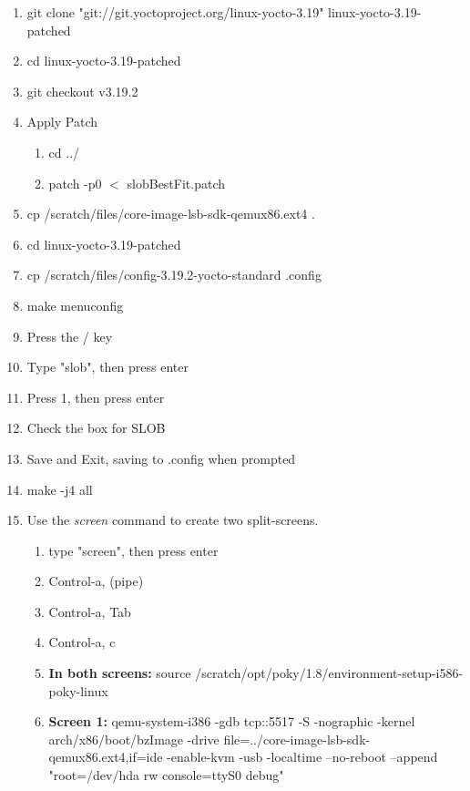 \documentclass[draftclsnofoot, onecolumn, 10pt, compsoc]{IEEEtran}
\begin{document}
			\begin{enumerate}
				\item git clone "git://git.yoctoproject.org/linux-yocto-3.19" linux-yocto-3.19-patched
				
				\item cd linux-yocto-3.19-patched
				
				\item git checkout v3.19.2
				
				\item Apply Patch
				\begin{enumerate}
					\item cd ../
					\item patch -p0 $<$ slobBestFit.patch
				\end{enumerate}
				
				\item cp /scratch/files/core-image-lsb-sdk-qemux86.ext4 .
				\item cd linux-yocto-3.19-patched
				\item cp /scratch/files/config-3.19.2-yocto-standard .config
				\item make menuconfig
				
				\item Press the / key
				\item Type "slob", then press enter
				\item Press 1, then press enter
				\item Check the box for SLOB
				\item Save and Exit, saving to .config when prompted
				
				\item make -j4 all
				
				\item Use the \textit{screen} command to create two split-screens.
				
				\begin{enumerate}
					\item type "screen", then press enter
					\item Control-a, (pipe)
					\item Control-a, Tab
					\item Control-a, c
					\item \textbf{In both screens:} source /scratch/opt/poky/1.8/environment-setup-i586-poky-linux

					\item{\textbf{Screen 1:} qemu-system-i386 -gdb tcp::5517 -S -nographic -kernel arch/x86/boot/bzImage -drive file=../core-image-lsb-sdk-qemux86.ext4,if=ide -enable-kvm -usb -localtime --no-reboot --append "root=/dev/hda rw console=ttyS0 debug"}
					

\end{enumerate}
\end{enumerate}
\end{document}
